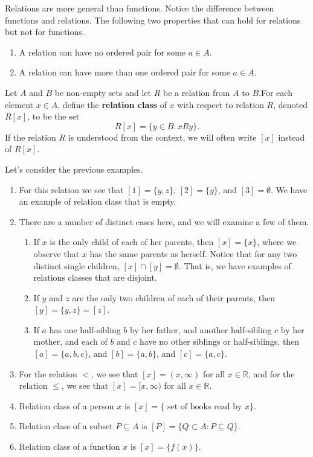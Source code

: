 \documentclass[a4paper,english,12pt]{article}
\begin{document}
\begin{rem} Relations are more general than functions. Notice the difference between functions and relations. The following two properties that can hold for relations but not for functions.
\begin{enumerate}
	\item A relation can have no ordered pair for some $a \in A$.
	\item A relation can have more than one ordered pair for some $a \in A$.
\end{enumerate}
\end{rem}
\begin{defn} Let $A$ and $B$ be non-empty sets and let $R$ be a relation from $A$ to $B$.For each element $x \in A$, define the \textbf{relation class} of $x$ with respect to relation $R$, denoted $R[x]$, to be the set
\begin{equation*} 
R[x] =\{y \in B : x R y \}.
\end{equation*} 
If the relation $R$ is understood from the context, we will often write $[x]$ instead of $R[x]$.
\end{defn}
\begin{exmp} Let's consider the previous examples.
\begin{enumerate}
	\item For this relation we see that $[1]=\{y,z\}$, $[2]=\{y\}$, and $[3] = \emptyset$. We have an example of relation class that is empty.
	\item There are a number of distinct cases here, and we will examine a few of them. 
	\begin{enumerate}
		\item If $x$ is the only child of each of her parents, then $[x] = \{x\}$, where we observe that
$x$ has the same parents as herself. Notice that for any two distinct single children, $[x] \cap [y] = \emptyset$. That is, we have examples of relations classes that are disjoint.
		\item If $y$ and $z$ are the only two children of each of their parents, then $[y] = \{y, z\} = [z]$. 
		\item If $a$ has one half-sibling $b$ by her father, and another half-sibling $c$ by her mother, and each of $b$ and $c$ have no other siblings or half-siblings, then $[a] = \{a, b, c\}$, and $[b] = \{a, b\}$, and $[c] = \{a, c\}$.
	\end{enumerate}
	\item For the relation $<$, we see that $[x] = (x, \infty)$ for all $x \in \mathbb{R}$, and for the relation
$\leq$, we see that $[x] = [x, \infty)$ for all $x \in \mathbb{R}$.
	\item Relation class of a person $x$ is $[x] = \{\text{ set of books read by }x\}$. 
	\item Relation class of a subset $P \subseteq A$ is $[P] = \{ Q \subset A: P \subseteq Q \}$.
	\item Relation class of a function $x$ is $[x] = \{f(x)\}$.
\end{enumerate}
\end{exmp}
\end{document}
